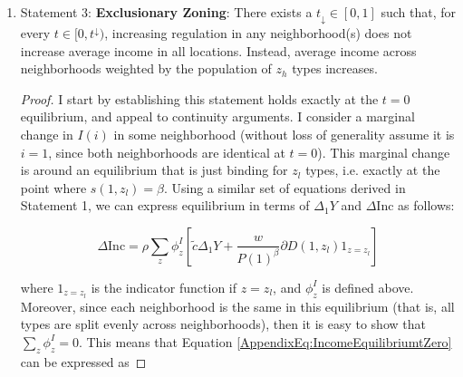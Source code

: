 \documentclass[12pt]{article}
\begin{document}
\begin{enumerate}
\begin{proof}
			\paragraph*{}
			Finally,  $\frac{\partial \text{Inc}(i)}{\partial I(1)}$ is continuous in $t$\footnote{By virtue of equilibrium values of $\text{Inc}(i)$ being differentiable in exogenous variables, which is a consequence of the differentiability of the equilibrium system and the Implicit function theorem.} and I established is strictly positive for every $i$ at the $t = 1$ equilibrium. By the Intermediate Value Theorem, there exists a $\tilde{t}(i)$ such that, for all $t(i) \in (\tilde{t}(i), 1]$, $\frac{\partial \text{Inc}_{\tilde{t}(i)}(i)}{\partial I(1)} > 0$. Define $t^{\uparrow} = \max_{i \in \{0, 1\}}\tilde{t}(i)$, which proves the statement. 
			
		\end{proof}
		
		
		\item Statement 3: \textbf{Exclusionary Zoning}: There exists a $t_{\downarrow} \in [0, 1]$ such that, for every $t \in [0, t^{\downarrow})$, increasing regulation in any neighborhood(s) does not increase average income in all locations. Instead, average income across neighborhoods weighted by the population of $z_{h}$ types increases. 
		
		\begin{proof}
			I start by establishing this statement holds exactly at the $t = 0$ equilibrium, and appeal to continuity arguments. I consider a marginal change in $I(i)$ in some neighborhood (without loss of generality assume it is $i = 1$, since both neighborhoods are identical at $t = 0$). This marginal change is around an equilibrium that is just binding for $z_{l}$ types, i.e. exactly at the point where $s(1, z_{l}) = \beta$. Using a similar set of equations derived in Statement 1, we can express equilibrium in terms of $\Delta_{1}Y$ and $\Delta \text{Inc}$ as follows:
			
			\begin{equation}\label{AppendixEq:IncomeEquilibriumtZero}
				\Delta \text{Inc} = \rho \sum_{z}\phi^{I}_{z}[\tilde{c} \Delta_{1} Y + \frac{w}{P(1)^{\beta}}\partial D(1, z_{l})1_{z = z_{l}}] 
			\end{equation}
			
			where $1_{z = z_{l}}$ is the indicator function if $z = z_{l}$, and $\phi^{I}_{z}$ is defined above. Moreover, since each neighborhood is the same in this equilibrium (that is, all types are split evenly across neighborhoods), then it is easy to show that $\sum_{z}\phi^{I}_{z} = 0$. This means that Equation \eqref{AppendixEq:IncomeEquilibriumtZero} can be expressed as 
			

\end{proof}
\end{enumerate}
\end{document}
